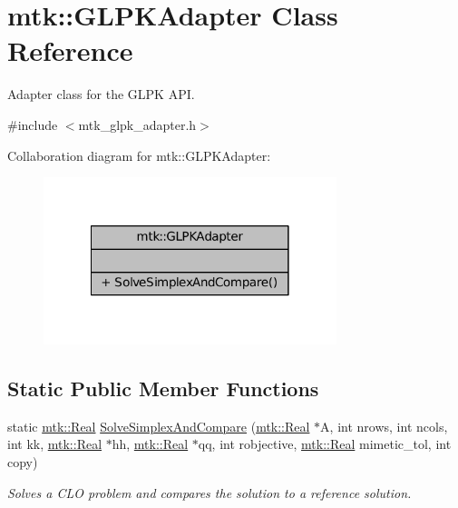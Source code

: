 \hypertarget{classmtk_1_1GLPKAdapter}{\section{mtk\-:\-:G\-L\-P\-K\-Adapter Class Reference}
\label{classmtk_1_1GLPKAdapter}
}


Adapter class for the G\-L\-P\-K A\-P\-I.  




{\ttfamily \#include $<$mtk\-\_\-glpk\-\_\-adapter.\-h$>$}



Collaboration diagram for mtk\-:\-:G\-L\-P\-K\-Adapter\-:\nopagebreak
\begin{figure}[H]
\begin{center}
\leavevmode
\includegraphics[width=242pt]{classmtk_1_1GLPKAdapter__coll__graph}
\end{center}
\end{figure}
\subsection*{Static Public Member Functions}
\begin{DoxyCompactItemize}
\item 
static \hyperlink{group__c01-roots_gac080bbbf5cbb5502c9f00405f894857d}{mtk\-::\-Real} \hyperlink{classmtk_1_1GLPKAdapter_a834480aca83e3c0d09fdab7fdb7e8a3f}{Solve\-Simplex\-And\-Compare} (\hyperlink{group__c01-roots_gac080bbbf5cbb5502c9f00405f894857d}{mtk\-::\-Real} $\ast$A, int nrows, int ncols, int kk, \hyperlink{group__c01-roots_gac080bbbf5cbb5502c9f00405f894857d}{mtk\-::\-Real} $\ast$hh, \hyperlink{group__c01-roots_gac080bbbf5cbb5502c9f00405f894857d}{mtk\-::\-Real} $\ast$qq, int robjective, \hyperlink{group__c01-roots_gac080bbbf5cbb5502c9f00405f894857d}{mtk\-::\-Real} mimetic\-\_\-tol, int copy)
\begin{DoxyCompactList}\small\item\em Solves a C\-L\-O problem and compares the solution to a reference solution. \end{DoxyCompactList}\end{DoxyCompactItemize}


